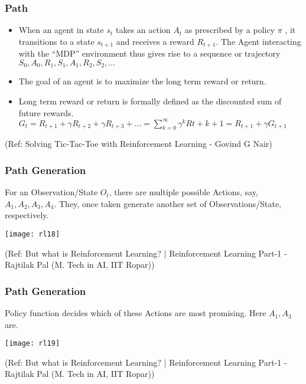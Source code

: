 \begin{frame}[fragile]\frametitle{Path}


\begin{itemize}
\item When an agent in state $s_t$ takes an action $A_t$ as prescribed by a policy $\pi$ , it transitions to a state $s_{t+1}$ and receives a reward $R_{t+1}$. The Agent interacting with the ``MDP'' environment thus gives rise to a sequence or trajectory $S_0,A_0,R_1,S_1,A_1,R_2,S_2,\ldots$
\item The goal of an agent is to maximize the long term reward or return.
\item Long term reward or return is formally defined as the discounted sum of future rewards. $G_t = R_{t+1} + \gamma R_{t+2} + \gamma R_{t+3} + \ldots = \sum_{k=0}^{\infty} \gamma^k R{t+k+1} = R_{t+1} + \gamma G_{t+1}$
\end{itemize}



{\tiny (Ref: Solving Tic-Tac-Toe with Reinforcement Learning - Govind G Nair)}

\end{frame}



\begin{frame}[fragile]\frametitle{Path Generation}

For an Observation/State $O_t$, there are multiple possible Actions, say, $A_1, A_2, A_3, A_4$. They, once taken generate another set of Observations/State, respectively.

\begin{center}
\texttt{[image: rl18]}
\end{center}


{\tiny (Ref: But what is Reinforcement Learning? | Reinforcement Learning Part-1 - Rajtilak Pal (M. Tech in AI, IIT Ropar))}

\end{frame}

\begin{frame}[fragile]\frametitle{Path Generation}

Policy function decides which of these Actions are most promising. Here $A_1, A_3$ are.

\begin{center}
\texttt{[image: rl19]}
\end{center}


{\tiny (Ref: But what is Reinforcement Learning? | Reinforcement Learning Part-1 - Rajtilak Pal (M. Tech in AI, IIT Ropar))}

\end{frame}

